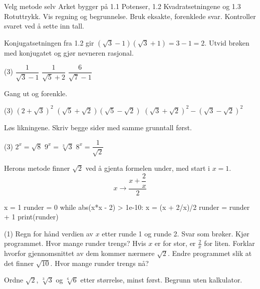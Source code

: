 
\begin{infoboks}{Velg metode selv}
Arket bygger på 1.1 Potenser, 1.2 Kvadratsetningene og 1.3 Rotuttrykk. Vis regning og begrunnelse.
Bruk eksakte, forenklede svar. Kontroller svaret ved å sette inn tall.
\end{infoboks}


Konjugatsetningen fra 1.2 gir $(\sqrt{3}-1)(\sqrt{3}+1) = 3 - 1 = 2$. Utvid brøken med konjugatet og gjør nevneren rasjonal.
\begin{tasks}(3)
  \task $\dfrac{1}{\sqrt{3}-1}$
  \task $\dfrac{1}{\sqrt{5}+2}$
  \task $\dfrac{6}{\sqrt{7}-1}$
\end{tasks}

Gang ut og forenkle.
\begin{tasks}(3)
  \task $(2+\sqrt{3})^2$
  \task $(\sqrt{5}+\sqrt{2})(\sqrt{5}-\sqrt{2})$
  \task $(\sqrt{3}+\sqrt{2})^2 - (\sqrt{3}-\sqrt{2})^2$
\end{tasks}

Løs likningene. Skriv begge sider med samme grunntall først.
\begin{tasks}(3)
  \task $2^x = \sqrt{8}$
  \task $9^x = \sqrt[3]{3}$
  \task $8^x = \dfrac{1}{\sqrt{2}}$
\end{tasks}


Herons metode finner $\sqrt{2}$ ved å gjenta formelen under, med start i $x = 1$.
\[ x \to \dfrac{x + \dfrac{2}{x}}{2} \]
\begin{kode}
x = 1
runder = 0
while abs(x*x - 2) > 1e-10:
    x = (x + 2/x)/2
    runder = runder + 1
print(runder)
\end{kode}
\begin{tasks}(1)
  \task Regn for hånd verdien av $x$ etter runde 1 og runde 2. Svar som brøker.
  \task Kjør programmet. Hvor mange runder trengs?
  \task Hvis $x$ er for stor, er $\frac{2}{x}$ for liten. Forklar hvorfor gjennomsnittet av dem kommer nærmere $\sqrt{2}$.
  \task Endre programmet slik at det finner $\sqrt{10}$. Hvor mange runder trengs nå?
\end{tasks}

Ordne $\sqrt{2}$, $\sqrt[3]{3}$ og $\sqrt[6]{6}$ etter størrelse, minst først. Begrunn uten kalkulator.

